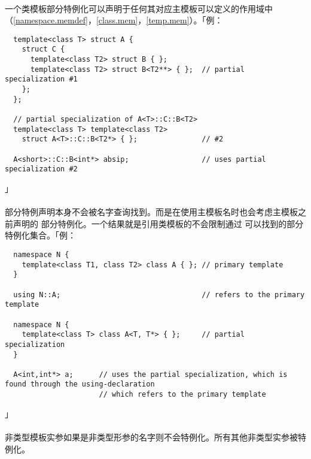 \paragraph{}
一个类模板部分特例化可以声明于任何其对应主模板可以定义的作用域中
（\ref{namespace.memdef}，\ref{class.mem}，\ref{temp.mem}）。「例：
\begin{lstlisting}
  template<class T> struct A {
    struct C {
      template<class T2> struct B { };
      template<class T2> struct B<T2**> { };  // partial specialization #1
    };
  };

  // partial specialization of A<T>::C::B<T2>
  template<class T> template<class T2>
    struct A<T>::C::B<T2*> { };               // #2

  A<short>::C::B<int*> absip;                 // uses partial specialization #2
\end{lstlisting}」

\paragraph{}
部分特例声明本身不会被名字查询找到。而是在使用主模板名时也会考虑主模板之前声明的
部分特例化。一个结果就是引用类模板的不会限制通过
可以找到的部分特例化集合。「例：
\begin{lstlisting}
  namespace N {
    template<class T1, class T2> class A { }; // primary template
  }

  using N::A;                                 // refers to the primary template

  namespace N {
    template<class T> class A<T, T*> { };     // partial specialization
  }

  A<int,int*> a;      // uses the partial specialization, which is found through the using-declaration
                      // which refers to the primary template
\end{lstlisting}」

\paragraph{}
非类型模板实参如果是非类型形参的名字则不会特例化。所有其他非类型实参被特例化。

